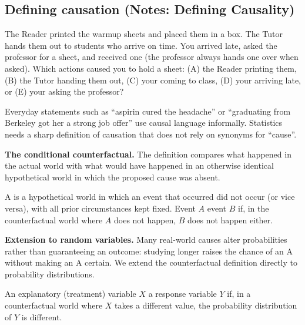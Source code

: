 \documentclass[10pt]{scrartcl}
\begin{document}
\subsection{Defining causation (Notes: Defining Causality)}

\begin{qbox}
  The Reader printed the warmup sheets and placed them in a box. The Tutor hands them out to students who arrive on time. You arrived late, asked the professor for a sheet, and received one (the professor always hands one over when asked). Which actions caused you to hold a sheet: (A) the Reader printing them, (B) the Tutor handing them out, (C) your coming to class, (D) your arriving late, or (E) your asking the professor?
\end{qbox}

Everyday statements such as ``aspirin cured the headache'' or ``graduating from Berkeley got her a strong job offer'' use causal language informally. Statistics needs a sharp definition of causation that does not rely on synonyms for ``cause''.

\medskip\noindent\textbf{The conditional counterfactual.} The definition compares what happened in the actual world with what would have happened in an otherwise identical hypothetical world in which the proposed cause was absent.

\begin{definition*}
  A  is a hypothetical world in which an event that occurred did not occur (or vice versa), with all prior circumstances kept fixed. Event $A$  event $B$ if, in the counterfactual world where $A$ does not happen, $B$ does not happen either.
\end{definition*}

\noindent\textbf{Extension to random variables.} Many real-world causes alter probabilities rather than guaranteeing an outcome: studying longer raises the chance of an A without making an A certain. We extend the counterfactual definition directly to probability distributions.

\begin{definition*}
  An explanatory (treatment) variable $X$  a response variable $Y$ if, in a counterfactual world where $X$ takes a different value, the probability distribution of $Y$ is different.
\end{definition*}
\end{document}
